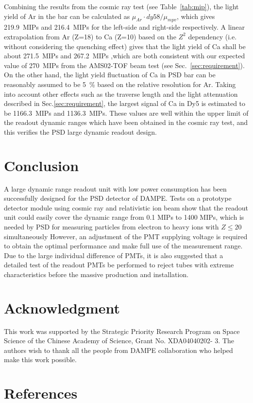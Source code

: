 \documentclass[preprint, times]{elsarticle}
\begin{document}
Combining the results from the cosmic ray test (see Table~\ref{tab:mip}), the light yield of Ar in the bar can be calculated as ${\mu_{Ar}\cdot dy58} / {\mu_{mpv}}$, which gives \SI{219.9}{MIPs} and \SI{216.4}{MIPs} for the left-side and right-side respectively.
A linear extrapolation from Ar (Z=18) to Ca (Z=10) based on the $Z^2$ dependency (i.e. without considering the quenching effect) gives that the light yield of Ca shall be about \SI{271.5}{MIPs} and \SI{267.2}{MIPs} ,which are both consistent with our expected value of \SI{270}{MIPs} from the AMS02-TOF beam test (see Sec.~\ref{sec:requirement}). 
On the other hand, the light yield fluctuation of Ca in PSD bar can be reasonably assumed to be \SI{5}{\percent} based on the relative resolution for Ar.
Taking into account other effects such as the traverse length and the light attenuation described in Sec.\ref{sec:requirement}, the largest signal of Ca in Dy5 is estimated to be \SI{1166.3}{MIPs} and \SI{1136.3}{MIPs}.
These values are well within the upper limit of the readout dynamic ranges which have been obtained in the cosmic ray test, and this verifies the PSD large dynamic readout design.


\section{Conclusion}
\label{sec:conclusion}
A large dynamic range readout unit with low power consumption has been successfully designed for the PSD detector of DAMPE.
Tests on a prototype detector module using cosmic ray and relativistic ion beam show that the readout unit could easily cover the dynamic range from 0.1 MIPs to 1400 MIPs, which is needed by PSD for measuring particles from electron to heavy ions with $Z\leq 20$ simultaneously 
However, an adjustment of the PMT supplying voltage is required to obtain the optimal performance and make full use of the measurement range. 
Due to the large individual difference of PMTs, it is also suggested that a detailed test of the readout PMTs be performed to reject tubes with extreme characteristics before the massive production and installation.

\section*{Acknowledgment}
\label{sec:acknowledgement}

This work was supported by the Strategic Priority Research Program on Space Science of the Chinese Academy of Science,
Grant No. XDA04040202- 3.
The authors wish to thank all the people from DAMPE collaboration who helped make this work possible.

\section*{References}
\label{sec:reference}



\end{document}
